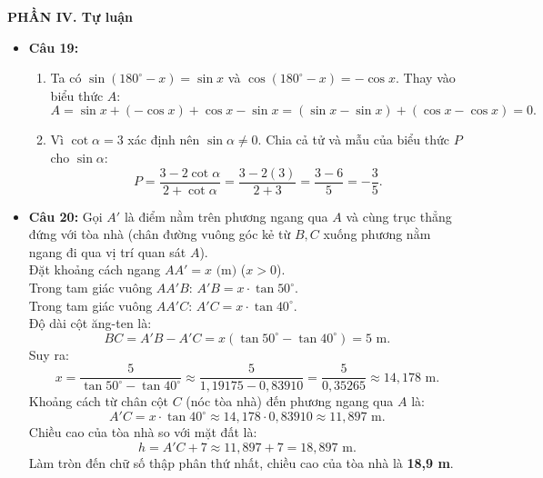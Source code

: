 \documentclass[12pt,a4paper]{article}
\begin{document}
\vspace{0.15cm}
\textbf{PHẦN IV. Tự luận}
\begin{itemize}[leftmargin=0.6cm, itemsep=2pt, topsep=1pt]
    \item \textbf{Câu 19:}
    \begin{enumerate}[label=\alph*), itemsep=1pt]
        \item Ta có $\sin(180^\circ - x) = \sin x$ và $\cos(180^\circ - x) = -\cos x$.
        Thay vào biểu thức $A$:
        \[
        A = \sin x + (-\cos x) + \cos x - \sin x = (\sin x - \sin x) + (\cos x - \cos x) = 0.
        \]
        \item Vì $\cot \alpha = 3$ xác định nên $\sin \alpha \ne 0$. Chia cả tử và mẫu của biểu thức $P$ cho $\sin \alpha$:
        \[
        P = \dfrac{3 - 2\cot \alpha}{2 + \cot \alpha} = \dfrac{3 - 2(3)}{2 + 3} = \dfrac{3 - 6}{5} = -\dfrac{3}{5}.
        \]
    \end{enumerate}

    \item \textbf{Câu 20:}
    Gọi $A'$ là điểm nằm trên phương ngang qua $A$ và cùng trục thẳng đứng với tòa nhà (chân đường vuông góc kẻ từ $B, C$ xuống phương nằm ngang đi qua vị trí quan sát $A$).\\
    Đặt khoảng cách ngang $A A' = x\text{ (m)}$ ($x > 0$).\\
    Trong tam giác vuông $A A' B$: $A'B = x \cdot \tan 50^\circ$.\\
    Trong tam giác vuông $A A' C$: $A'C = x \cdot \tan 40^\circ$.\\
    Độ dài cột ăng-ten là:
    \[
    BC = A'B - A'C = x(\tan 50^\circ - \tan 40^\circ) = 5\text{ m}.
    \]
    Suy ra:
    \[
    x = \dfrac{5}{\tan 50^\circ - \tan 40^\circ} \approx \dfrac{5}{1{,}19175 - 0{,}83910} = \dfrac{5}{0{,}35265} \approx 14{,}178\text{ m}.
    \]
    Khoảng cách từ chân cột $C$ (nóc tòa nhà) đến phương ngang qua $A$ là:
    \[
    A'C = x \cdot \tan 40^\circ \approx 14{,}178 \cdot 0{,}83910 \approx 11{,}897\text{ m}.
    \]
    Chiều cao của tòa nhà so với mặt đất là:
    \[
    h = A'C + 7 \approx 11{,}897 + 7 = 18{,}897\text{ m}.
    \]
    Làm tròn đến chữ số thập phân thứ nhất, chiều cao của tòa nhà là \textbf{18,9 m}.


\end{itemize}
\end{document}
